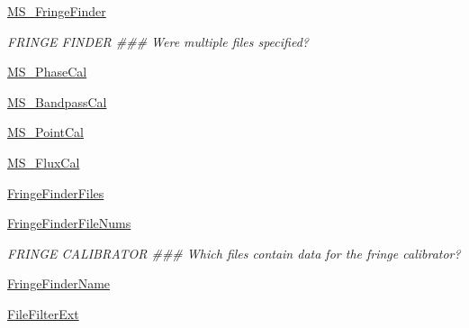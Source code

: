 \begin{DoxyCompactItemize}
\hyperlink{class_pipeline_1_1_pipeline_a1898d8d95c81fb15fa5393bd8614df02}{\-M\-S\-\_\-\-Fringe\-Finder}
\begin{DoxyCompactList}\small\item\em \-F\-R\-I\-N\-G\-E \-F\-I\-N\-D\-E\-R \#\#\# \-Were multiple files specified? \end{DoxyCompactList}\item 
\hyperlink{class_pipeline_1_1_pipeline_ae9541679af55d46204a13a74f6b95264}{\-M\-S\-\_\-\-Phase\-Cal}
\item 
\hyperlink{class_pipeline_1_1_pipeline_ad2225653e6f3363bef313fd94157e1d8}{\-M\-S\-\_\-\-Bandpass\-Cal}
\item 
\hyperlink{class_pipeline_1_1_pipeline_a88d8c67941cbfe2c921b49b3b19368d2}{\-M\-S\-\_\-\-Point\-Cal}
\item 
\hyperlink{class_pipeline_1_1_pipeline_af196bc69ff80c8d1a1b1fb74768bb915}{\-M\-S\-\_\-\-Flux\-Cal}
\item 
\hyperlink{class_pipeline_1_1_pipeline_aebdf35c9606f6335a310e94226e69baa}{\-Fringe\-Finder\-Files}
\item 
\hyperlink{class_pipeline_1_1_pipeline_a11a0028cef4ae537ab5e3329a9e17393}{\-Fringe\-Finder\-File\-Nums}
\begin{DoxyCompactList}\small\item\em \-F\-R\-I\-N\-G\-E \-C\-A\-L\-I\-B\-R\-A\-T\-O\-R \#\#\# \-Which files contain data for the fringe calibrator? \end{DoxyCompactList}\item 
\hyperlink{class_pipeline_1_1_pipeline_adebe7d045f35673273c231af5251b3a4}{\-Fringe\-Finder\-Name}
\item 
\hyperlink{class_pipeline_1_1_pipeline_a81dffe6f9b49397753980b59e2cd7255}{\-File\-Filter\-Ext}
\end{DoxyCompactItemize}


